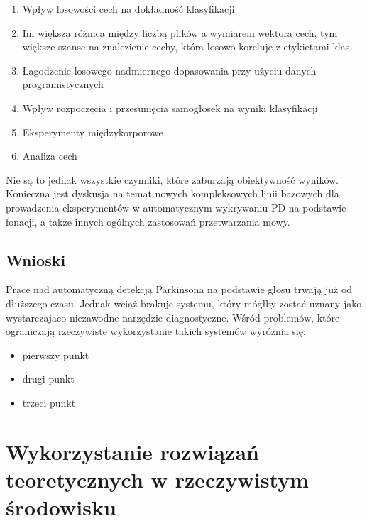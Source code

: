 \begin{enumerate}[label={\alph*)}]
  	\item Wpływ losowości cech na dokładność klasyfikacji
	\item [] Im większa różnica między liczbą plików a wymiarem wektora cech, tym większe szanse na znalezienie cechy, która losowo koreluje z etykietami klas.
  	\item Łagodzenie losowego nadmiernego dopasowania przy użyciu danych programistycznych
	\item Wpływ rozpoczęcia i przesunięcia samogłosek na wyniki klasyfikacji
 	\item Eksperymenty międzykorporowe
	\item Analiza cech
\end{enumerate}



Nie są to jednak wszystkie czynniki, które zaburzają obiektywność wyników. Konieczna jest dyskusja na temat nowych
kompleksowych linii bazowych dla prowadzenia eksperymentów w automatycznym wykrywaniu PD na podstawie fonacji,
a także innych ogólnych zastosowań przetwarzania mowy.


\subsection{Wnioski}
\label{subsec:wnioski}

Prace nad automatyczną detekcją Parkinsona na podstawie głosu trwają już od dłuższego czasu.
Jednak wciąż brakuje systemu, który mógłby zostać uznany jako wystarczajaco niezawodne narzędzie diagnostyczne.
Wśród problemów, które ograniczają rzeczywiste wykorzystanie takich systemów wyróżnia się:

\begin{itemize}
\item pierwszy punkt
\item drugi punkt
\item trzeci punkt
\end{itemize}


\section{Wykorzystanie rozwiązań teoretycznych w rzeczywistym środowisku}\label{sec:teoria-vs-praktyka}


